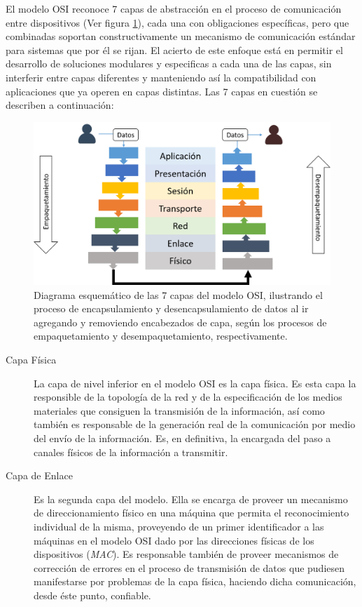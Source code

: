 \begin{intro}
El modelo OSI reconoce 7 capas de abstracción en el proceso de comunicación entre dispositivos (Ver figura \ref{fig:osi7capas}), cada una con obligaciones específicas, pero que combinadas soportan constructivamente un mecanismo de comunicación estándar para sistemas que por él se rijan. El acierto de este enfoque está en permitir el desarrollo de soluciones modulares y especificas a cada una de las capas, sin interferir entre capas diferentes y manteniendo así la compatibilidad con aplicaciones que ya operen en capas distintas. Las 7 capas en cuestión se describen a continuación:

\begin{figure}[!h]
	\centering
	\includegraphics[scale=.45]{imagenes/OSI7Capas.png}
	\caption{Diagrama esquemático de las 7 capas del modelo OSI, ilustrando el proceso de encapsulamiento y desencapsulamiento de datos al ir agregando y removiendo encabezados de capa, según los procesos de empaquetamiento y desempaquetamiento, respectivamente.}
	\label{fig:osi7capas}
\end{figure}

\begin{description}
\item[Capa Física] La capa de nivel inferior en el modelo OSI es la capa física. Es esta capa la responsible de la topología de la red y de la especificación de los medios materiales que consiguen la transmisión de la información, así como también es responsable de la generación real de la comunicación por medio del envío de la información. Es, en definitiva, la encargada del paso a canales físicos de la información a transmitir.

\item[Capa de Enlace] Es la segunda capa del modelo. Ella se encarga de proveer un mecanismo de direccionamiento físico en una máquina que permita el reconocimiento individual de la misma, proveyendo de un primer identificador a las máquinas en el modelo OSI dado por las direcciones físicas de los dispositivos (\emph{MAC}). Es responsable también de proveer mecanismos de corrección de errores en el proceso de transmisión de datos que pudiesen manifestarse por problemas de la capa física, haciendo dicha comunicación, desde éste punto, confiable.


\end{description}
\end{intro}
